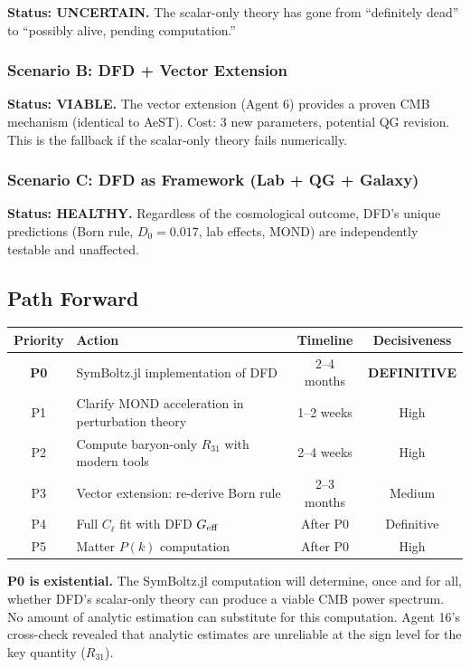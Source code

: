 \documentclass[11pt,a4paper]{article}
\begin{document}
\textbf{Status: UNCERTAIN.} The scalar-only theory has gone from ``definitely dead'' to ``possibly alive, pending computation.''

\subsubsection{Scenario B: DFD + Vector Extension}

\textbf{Status: VIABLE.} The vector extension (Agent 6) provides a proven CMB mechanism (identical to AeST). Cost: 3 new parameters, potential QG revision. This is the fallback if the scalar-only theory fails numerically.

\subsubsection{Scenario C: DFD as Framework (Lab + QG + Galaxy)}

\textbf{Status: HEALTHY.} Regardless of the cosmological outcome, DFD's unique predictions (Born rule, $D_0 = 0.017$, lab effects, MOND) are independently testable and unaffected.

\subsection{Path Forward}

\begin{center}
\begin{tabular}{clcc}
\toprule
\textbf{Priority} & \textbf{Action} & \textbf{Timeline} & \textbf{Decisiveness} \\
\midrule
\textbf{P0} & SymBoltz.jl implementation of DFD & 2--4 months & \textbf{DEFINITIVE} \\
P1 & Clarify MOND acceleration in perturbation theory & 1--2 weeks & High \\
P2 & Compute baryon-only $R_{31}$ with modern tools & 2--4 weeks & High \\
P3 & Vector extension: re-derive Born rule & 2--3 months & Medium \\
P4 & Full $C_\ell$ fit with DFD $G_{\rm eff}$ & After P0 & Definitive \\
P5 & Matter $P(k)$ computation & After P0 & High \\
\bottomrule
\end{tabular}
\end{center}

\textbf{P0 is existential.} The SymBoltz.jl computation will determine, once and for all, whether DFD's scalar-only theory can produce a viable CMB power spectrum. No amount of analytic estimation can substitute for this computation. Agent 16's cross-check revealed that analytic estimates are unreliable at the sign level for the key quantity ($R_{31}$).
\end{document}
